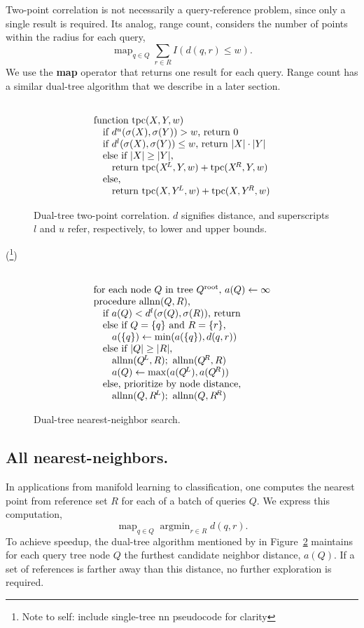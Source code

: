 \documentclass[twoside,leqno,twocolumn]{article}
\newcommand{\authornote}[1]{(\footnote{Note to self: #1})}
\newcommand{\authorsnote}[1]{\authornote{#1}}
\DeclareMathOperator*{\map}{map}
\DeclareMathOperator*{\argmin}{argmin}
\newcommand{\fig}[1]{Figure~\ref{fig:#1}}
\newcommand{\psty}{}
\newcommand{\X}{\\ \psty}
\newcommand{\x}{\X \hspace{0.13in}}
\newcommand{\xx}{\X \hspace{0.26in}}
\newcommand{\mysub}[1]{\subsection{#1.}}
\newcommand{\defterm}[1]{{\bf #1}}
\newcommand{\kdroot}[1]{#1^{\text{root}}}
\newcommand{\kdleft}[1]{#1^{\!L}}
\newcommand{\kdright}[1]{#1^{\!R}}
\newcommand{\lo}[1]{#1^{l}}
\newcommand{\up}[1]{#1^{u}}
\newcommand{\distlo}{\lo{d}}
\newcommand{\distup}{\up{d}}
\newcommand{\dist}[2]{d(#1,#2)}
\newcommand{\outstat}{\sigma}
\begin{document}
Two-point correlation is not necessarily a query-reference problem, since only a single result is required.
Its analog, range count, considers the number of points within the radius for each query,
\[\map_{q \in Q} \sum_{r \in R} I(d(q, r) \leq w).\]
We use the \defterm{map} operator that returns one result for each query.
Range count has a similar dual-tree algorithm that we describe in a later section.

\begin{figure}[t]
  \[
    \begin{array}[t]{l}
      \X \text{function tpc}(X, Y, w)
      \x \text{if }\distup(\outstat(X), \outstat(Y)) > w\text{, return }0
      \x \text{if }\distlo(\outstat(X), \outstat(Y)) \leq w\text{, return } |X| \cdot |Y|
      \x \text{else if }|X| \geq |Y|\text{,}
      \xx \text{return tpc}(\kdleft{X}, Y, w) + \text{tpc}(\kdright{X}, Y, w)
      \x \text{else,}
      \xx \text{return tpc}(X, \kdleft{Y}, w) + \text{tpc}(X, \kdright{Y}, w)
    \end{array}
  \]
  \caption{\label{fig:tpc} Dual-tree two-point correlation.
  $d$ signifies distance, and superscripts $l$ and $u$ refer, respectively, to lower and upper bounds.}
\end{figure}

\authorsnote{include single-tree nn pseudocode for clarity}

\begin{figure}[t]
  \begin{displaymath}
   \begin{array}[t]{l}
     \X \text{for each node }Q\text{ in tree } \kdroot{Q}\text{, }a(Q) \gets \infty
     \X \text{procedure allnn}(Q,R)\text{,}
     \x \text{if }a(Q) < \distlo(\outstat(Q), \outstat(R))\text{, return}
     \x \text{else if }Q = \{q\} \text{ and } R = \{r\}\text{,}
     \xx a(\{q\}) \gets \min(a(\{q\}), \dist{q}{r})
     \x \text{else if }|Q| \geq |R|\text{,}
     \xx \text{allnn}(\kdleft{Q}, R); \text{ allnn}(\kdright{Q}, R)
     \xx a(Q) \gets \max(a(\kdleft{Q}), a(\kdright{Q}))
     \x \text{else, prioritize by node distance,}
     \xx \text{allnn}(Q, \kdleft{R}); \text{ allnn}(Q, \kdright{R})
   \end{array}
  \end{displaymath}
  \caption{\label{fig:allnn} Dual-tree nearest-neighbor search.}
\end{figure}

\mysub{All nearest-neighbors}
In applications from manifold learning to classification, one computes the nearest point from reference set $R$ for each of a batch of queries $Q$.
We express this computation,
\[\map_{q \in Q} \argmin_{r \in R} d(q,r).\]
\noindent To achieve speedup, the dual-tree algorithm mentioned by \cite{gray_nbody} in \fig{allnn} maintains for each query tree node $Q$ the furthest candidate neighbor distance, $a(Q)$.
If a set of references is farther away than this distance, no further exploration is required.
\end{document}
